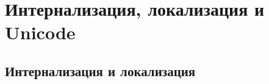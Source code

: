 \chapter{ Интернализация, локализация и Unicode } \label{chapt4}

\section{ Интернализация и локализация} \label{sect4_1}